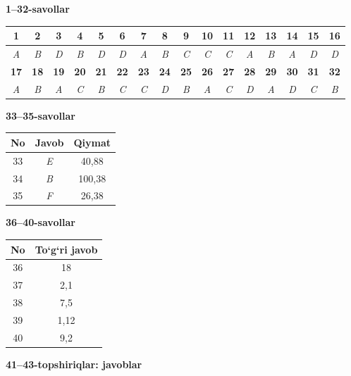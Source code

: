 \documentclass[11pt,a4paper]{article}
\begin{document}
\noindent\textbf{1--32-savollar}\par\smallskip
\noindent\begin{tabular}{|c|c|c|c|c|c|c|c|c|c|c|c|c|c|c|c|}\hline
\textbf{1} & \textbf{2} & \textbf{3} & \textbf{4} & \textbf{5} & \textbf{6} & \textbf{7} & \textbf{8} & \textbf{9} & \textbf{10} & \textbf{11} & \textbf{12} & \textbf{13} & \textbf{14} & \textbf{15} & \textbf{16}\\\hline
\textsl{A} & \textsl{B} & \textsl{D} & \textsl{B} & \textsl{D} & \textsl{D} & \textsl{A} & \textsl{B} & \textsl{C} & \textsl{C} & \textsl{C} & \textsl{A} & \textsl{B} & \textsl{A} & \textsl{D} & \textsl{D}\\\hline
\textbf{17} & \textbf{18} & \textbf{19} & \textbf{20} & \textbf{21} & \textbf{22} & \textbf{23} & \textbf{24} & \textbf{25} & \textbf{26} & \textbf{27} & \textbf{28} & \textbf{29} & \textbf{30} & \textbf{31} & \textbf{32}\\\hline
\textsl{A} & \textsl{B} & \textsl{A} & \textsl{C} & \textsl{B} & \textsl{C} & \textsl{C} & \textsl{D} & \textsl{B} & \textsl{A} & \textsl{C} & \textsl{D} & \textsl{A} & \textsl{D} & \textsl{C} & \textsl{B}\\\hline
\end{tabular}\par\medskip
\noindent\textbf{33--35-savollar}\par\smallskip
\noindent\begin{tabular}{|c|c|c|}\hline \textbf{No} & \textbf{Javob} & \textbf{Qiymat}\\\hline
33 & \textsl{E} & 40,88\\\hline
34 & \textsl{B} & 100,38\\\hline
35 & \textsl{F} & 26,38\\\hline
\end{tabular}\par\medskip
\noindent\textbf{36--40-savollar}\par\smallskip
\noindent\begin{tabular}{|c|c|}\hline \textbf{No} & \textbf{To`g`ri javob}\\\hline
36 & 18\\\hline
37 & 2,1\\\hline
38 & 7,5\\\hline
39 & 1,12\\\hline
40 & 9,2\\\hline
\end{tabular}\par\medskip
\noindent\textbf{41--43-topshiriqlar: javoblar}\par\smallskip
\end{document}
